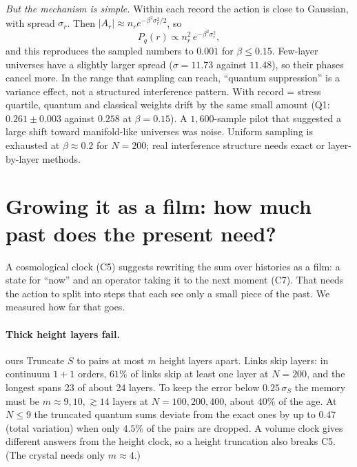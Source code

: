 \documentclass[11pt,a4paper]{article}
\newcommand{\tagbox}[2]{\textsf{\scriptsize\colorbox{#1!12}{\textcolor{#1!70!black}{#2}}}}
\newcommand{\ours}{\tagbox{orange}{ours}}
\begin{document}
\emph{But the mechanism is simple.} Within each record the action is close to Gaussian, with spread $\sigma_r$. Then $|A_r|\approx n_r e^{-\beta^2\sigma_r^2/2}$, so
\begin{equation}
P_q(r)\propto n_r^2\,e^{-\beta^2\sigma_r^2},
\end{equation}
and this reproduces the sampled numbers to $0.001$ for $\beta\le0.15$. Few-layer universes have a slightly larger spread ($\sigma=11.73$ against $11.48$), so their phases cancel more. In the range that sampling can reach, ``quantum suppression'' is a variance effect, not a structured interference pattern. With record = stress quartile, quantum and classical weights drift by the same small amount (Q1: $0.261\pm0.003$ against $0.258$ at $\beta=0.15$). A $1{,}600$-sample pilot that suggested a large shift toward manifold-like universes was noise. Uniform sampling is exhausted at $\beta\approx0.2$ for $N=200$; real interference structure needs exact or layer-by-layer methods.

\section{Growing it as a film: how much past does the present need?}\label{sec:film}
A cosmological clock (C5) suggests rewriting the sum over histories as a film: a state for ``now'' and an operator taking it to the next moment (C7). That needs the action to split into steps that each see only a small piece of the past. We measured how far that goes.

\paragraph{Thick height layers fail.} \ours{} Truncate $S$ to pairs at most $m$ height layers apart. Links skip layers: in continuum $1+1$ orders, $61\%$ of links skip at least one layer at $N=200$, and the longest spans 23 of about 24 layers. To keep the error below $0.25\,\sigma_S$ the memory must be $m\approx9,10,\gtrsim14$ layers at $N=100,200,400$, about $40\%$ of the age. At $N\le9$ the truncated quantum sums deviate from the exact ones by up to 0.47 (total variation) when only $4.5\%$ of the pairs are dropped. A volume clock gives different answers from the height clock, so a height truncation also breaks C5. (The crystal needs only $m\approx4$.)
\end{document}
